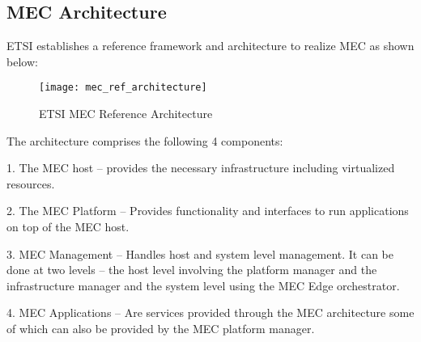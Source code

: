 \subsection{MEC Architecture}
ETSI establishes a reference framework and architecture to realize MEC as shown below:

\begin{figure}
	\centering
    \texttt{[image: mec\_ref\_architecture]}
    \label{fig:Figure 2}
    \caption{ETSI MEC Reference Architecture}
\end{figure}

The architecture comprises the following 4 components:

1. The MEC host – provides the necessary infrastructure including virtualized resources.

2. The MEC Platform – Provides functionality and interfaces to run applications on top of the MEC host.

3. MEC Management – Handles host and system level management. It can be done at two levels – the host level involving the platform manager and the infrastructure manager and the system level using the MEC Edge orchestrator. 

4. MEC Applications – Are services provided through the MEC architecture some of which can also be provided by the MEC platform manager.
